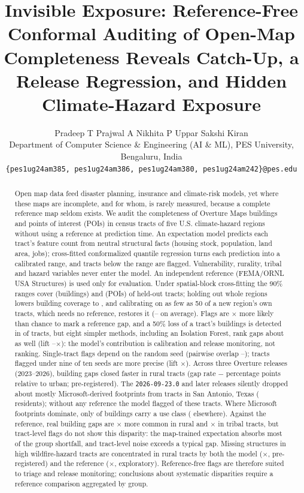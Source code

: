 \documentclass[11pt]{article}
\title{Invisible Exposure: Reference-Free Conformal Auditing of Open-Map Completeness Reveals Catch-Up, a Release Regression, and Hidden Climate-Hazard Exposure}
\author{Pradeep T \quad Prajwal A \quad Nikhita P Uppar \quad Sakshi Kiran\\[0.4em]
\small Department of Computer Science \& Engineering (AI \& ML), PES University, Bengaluru, India\\
\small \texttt{\{pes1ug24am385, pes1ug24am386, pes1ug24am380, pes1ug24am242\}@pes.edu}}
\date{}
\begin{document}
\maketitle

\begin{abstract}
Open map data feed disaster planning, insurance and climate-risk models, yet where these maps are incomplete, and for whom, is rarely measured, because a complete reference map seldom exists. We audit the completeness of Overture Maps buildings and points of interest (POIs) in \NTracts{} census tracts of five U.S. climate-hazard regions without using a reference at prediction time.
An expectation model predicts each tract's feature count from neutral structural facts (housing stock, population, land area, jobs); cross-fitted conformalized quantile regression turns each prediction into a calibrated range, and tracts below the range are flagged. Vulnerability, rurality, tribal and hazard variables never enter the model. An independent reference (FEMA/ORNL USA Structures) is used only for evaluation.
Under spatial-block cross-fitting the 90\% ranges cover \CovBldg{} (buildings) and \CovPoi{} (POIs) of held-out tracts; holding out whole regions lowers building coverage to \CovLoroBldg{}, and calibrating on as few as 50 of a new region's own tracts, which needs no reference, restores it (\JtFiftyMin{}--\JtFiftyMax{} on average).
Flags are \LiftBldg{}$\times$ more likely than chance to mark a reference gap, and a 50\% loss of a tract's buildings is detected in \DelFiftyBldg{} of tracts, but eight simpler methods, including an Isolation Forest, rank gaps about as well (lift \MgLiftMin{}--\MgLiftMax{}$\times$): the model's contribution is calibration and release monitoring, not ranking. Single-tract flags depend on the random seed (pairwise overlap \JsPairMin{}--\JsPairMax{}); tracts flagged under nine of ten seeds are more precise (lift \JsStableLift{}$\times$).
Across three Overture releases (2023--2026), building gaps closed faster in rural tracts (gap rate $-$\DidRuralPP{} percentage points relative to urban; pre-registered). The \texttt{2026-09-23.0} and later releases silently dropped about \EOneLost{} mostly Microsoft-derived footprints from \EOneTracts{} tracts in San Antonio, Texas (\EOneResidents{} residents); without any reference the model flagged \EOneFlagAfter{} of these tracts. Where Microsoft footprints dominate, only \MgDomLabel{} of buildings carry a use class (\MgOtherLabel{} elsewhere).
Against the reference, real building gaps are \RvRuralRef{}$\times$ more common in rural and \RvTribalRef{}$\times$ in tribal tracts, but tract-level flags do not show this disparity: the map-trained expectation absorbs most of the group shortfall, and tract-level noise exceeds a typical gap. Missing structures in high wildfire-hazard tracts are concentrated in rural tracts by both the model (\HFiveWildRural{}$\times$, pre-registered) and the reference (\JhWildfireRural{}$\times$, exploratory). Reference-free flags are therefore suited to triage and release monitoring; conclusions about systematic disparities require a reference comparison aggregated by group.
\end{abstract}
\end{document}
